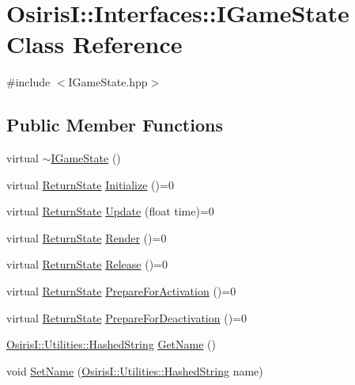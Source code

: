 \hypertarget{class_osiris_i_1_1_interfaces_1_1_i_game_state}{\section{Osiris\-I\-:\-:Interfaces\-:\-:I\-Game\-State Class Reference}
\label{class_osiris_i_1_1_interfaces_1_1_i_game_state}
}


{\ttfamily \#include $<$I\-Game\-State.\-hpp$>$}

\subsection*{Public Member Functions}
\begin{DoxyCompactItemize}
\item 
virtual \hyperlink{class_osiris_i_1_1_interfaces_1_1_i_game_state_a4fc1954f4f2e98cfec15f5f8eeb29d29}{$\sim$\-I\-Game\-State} ()
\item 
virtual \hyperlink{namespace_osiris_i_a8f53bf938dc75c65c6a529694514013e}{Return\-State} \hyperlink{class_osiris_i_1_1_interfaces_1_1_i_game_state_ac5fe7202aa62ff76cdb2b012f48973b8}{Initialize} ()=0
\item 
virtual \hyperlink{namespace_osiris_i_a8f53bf938dc75c65c6a529694514013e}{Return\-State} \hyperlink{class_osiris_i_1_1_interfaces_1_1_i_game_state_af6fa723631d1caf29cb63018ea83c7b1}{Update} (float time)=0
\item 
virtual \hyperlink{namespace_osiris_i_a8f53bf938dc75c65c6a529694514013e}{Return\-State} \hyperlink{class_osiris_i_1_1_interfaces_1_1_i_game_state_a0734242b62cb96f67f039a61442f8b93}{Render} ()=0
\item 
virtual \hyperlink{namespace_osiris_i_a8f53bf938dc75c65c6a529694514013e}{Return\-State} \hyperlink{class_osiris_i_1_1_interfaces_1_1_i_game_state_a3ef62af950ca2900523e7513f062a7bc}{Release} ()=0
\item 
virtual \hyperlink{namespace_osiris_i_a8f53bf938dc75c65c6a529694514013e}{Return\-State} \hyperlink{class_osiris_i_1_1_interfaces_1_1_i_game_state_a13fdf51b54e63d102faa61069503e4a5}{Prepare\-For\-Activation} ()=0
\item 
virtual \hyperlink{namespace_osiris_i_a8f53bf938dc75c65c6a529694514013e}{Return\-State} \hyperlink{class_osiris_i_1_1_interfaces_1_1_i_game_state_abf2e15033790308618ada58e27c877ef}{Prepare\-For\-Deactivation} ()=0
\item 
\hyperlink{class_osiris_i_1_1_utilities_1_1_hashed_string}{Osiris\-I\-::\-Utilities\-::\-Hashed\-String} \hyperlink{class_osiris_i_1_1_interfaces_1_1_i_game_state_a63cdf6df5e65d87982053d7b4922d7e2}{Get\-Name} ()
\item 
void \hyperlink{class_osiris_i_1_1_interfaces_1_1_i_game_state_a4919b29a98d2e3c7f8cc22673628c35b}{Set\-Name} (\hyperlink{class_osiris_i_1_1_utilities_1_1_hashed_string}{Osiris\-I\-::\-Utilities\-::\-Hashed\-String} name)
\end{DoxyCompactItemize}


